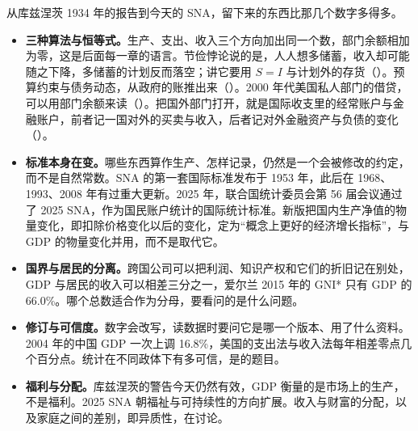 从库兹涅茨 1934 年的报告到今天的 SNA，留下来的东西比那几个数字多得多。
\begin{itemize}
\item \textbf{三种算法与恒等式。}生产、支出、收入三个方向加出同一个数，部门余额相加为零，这是后面每一章的语言。节俭悖论说的是，人人想多储蓄，收入却可能随之下降，多储蓄的计划反而落空；讲它要用 $S=I$ 与计划外的存货（）。预算约束与债务动态，从政府的账推出来（）。2000 年代美国私人部门的借贷，可以用部门余额来读（）。把国外部门打开，就是国际收支里的经常账户与金融账户，前者记一国对外的买卖与收入，后者记对外金融资产与负债的变化（）。

\item \textbf{标准本身在变。}哪些东西算作生产、怎样记录，仍然是一个会被修改的约定，而不是自然常数。SNA 的第一套国际标准发布于 1953 年，此后在 1968、1993、2008 年有过重大更新\cite{sna2008}。2025 年，联合国统计委员会第 56 届会议通过了 2025 SNA，作为国民账户统计的国际统计标准\cite{un2025sna}。新版把国内生产净值的物量变化，即扣除价格变化以后的变化，定为“概念上更好的经济增长指标”，与 GDP 的物量变化并用，而不是取代它\cite{sna2025}。

\item \textbf{国界与居民的分离。}跨国公司可以把利润、知识产权和它们的折旧记在别处，GDP 与居民的收入可以相差三分之一，爱尔兰 2015 年的 GNI* 只有 GDP 的 66.0\%。哪个总数适合作为分母，要看问的是什么问题。

\item \textbf{修订与可信度。}数字会改写，读数据时要问它是哪一个版本、用了什么资料。2004 年的中国 GDP 一次上调 16.8\%，美国的支出法与收入法每年相差零点几个百分点。统计在不同政体下有多可信，是的题目。

\item \textbf{福利与分配。}库兹涅茨的警告今天仍然有效，GDP 衡量的是市场上的生产，不是福利。2025 SNA 朝福祉与可持续性的方向扩展。收入与财富的分配，以及家庭之间的差别，即异质性，在讨论。
\end{itemize}

